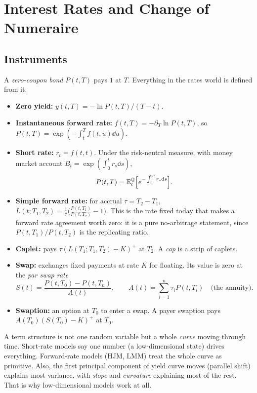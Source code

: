 \chapter{Interest Rates and Change of Numeraire}\label{ch:rates}

\section{Instruments}

A \emph{zero-coupon bond} $P(t,T)$ pays $1$ at $T$. Everything in the rates world is defined from it.
\begin{itemize}
\item \textbf{Zero yield:} $y(t,T)=-\ln P(t,T)/(T-t)$.
\item \textbf{Instantaneous forward rate:} $f(t,T)=-\partial_T\ln P(t,T)$, so $P(t,T)=\exp(-\int_t^Tf(t,u)\dd u)$.
\item \textbf{Short rate:} $r_t=f(t,t)$. Under the risk-neutral measure, with money market account $B_t=\exp(\int_0^tr_s\dd s)$,
\[
P(t,T)=\mathbb{E}^{\mathbb{Q}}_t\Bigl[e^{-\int_t^Tr_s\mathrm{d} s}\Bigr].
\]
\item \textbf{Simple forward rate:} for accrual $\tau=T_2-T_1$, $L(t;T_1,T_2)=\frac1\tau\bigl(\frac{P(t,T_1)}{P(t,T_2)}-1\bigr)$. This is the rate fixed today that makes a forward rate agreement worth zero: it is a pure no-arbitrage statement, since $P(t,T_1)/P(t,T_2)$ is the replicating ratio.
\item \textbf{Caplet:} pays $\tau(L(T_1;T_1,T_2)-K)^+$ at $T_2$. A \emph{cap} is a strip of caplets.
\item \textbf{Swap:} exchanges fixed payments at rate $K$ for floating. Its value is zero at the \emph{par swap rate}
\[
S(t)=\frac{P(t,T_0)-P(t,T_n)}{A(t)},\qquad A(t)=\sum_{i=1}^n\tau_iP(t,T_i)\quad\text{(the annuity)}.
\]
\item \textbf{Swaption:} an option at $T_0$ to enter a swap. A payer swaption pays $A(T_0)(S(T_0)-K)^+$ at $T_0$.
\end{itemize}

\begin{intuition}
A term structure is not one random variable but a whole \emph{curve} moving through time. Short-rate models say one number (a low-dimensional state) drives everything. Forward-rate models (HJM, LMM) treat the whole curve as primitive. Also, the first principal component of yield curve moves (parallel shift) explains most variance, with \emph{slope} and \emph{curvature} explaining most of the rest. That is why low-dimensional models work at all.
\end{intuition}

